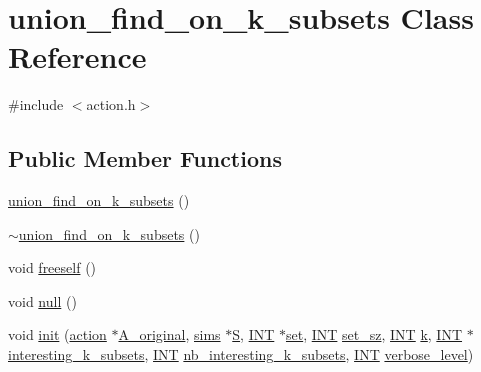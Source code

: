 \hypertarget{classunion__find__on__k__subsets}{}\section{union\+\_\+find\+\_\+on\+\_\+k\+\_\+subsets Class Reference}
\label{classunion__find__on__k__subsets}


{\ttfamily \#include $<$action.\+h$>$}

\subsection*{Public Member Functions}
\begin{DoxyCompactItemize}
\item 
\mbox{\hyperlink{classunion__find__on__k__subsets_a17b8d772080d27f13f0b80caefd0e727}{union\+\_\+find\+\_\+on\+\_\+k\+\_\+subsets}} ()
\item 
\mbox{\hyperlink{classunion__find__on__k__subsets_a51899d7dd8c5b989b398fba473188060}{$\sim$union\+\_\+find\+\_\+on\+\_\+k\+\_\+subsets}} ()
\item 
void \mbox{\hyperlink{classunion__find__on__k__subsets_a3e63adbe527692c3c73490de630fb371}{freeself}} ()
\item 
void \mbox{\hyperlink{classunion__find__on__k__subsets_a541bf34ce4b5db0e815a63ef6107f254}{null}} ()
\item 
void \mbox{\hyperlink{classunion__find__on__k__subsets_aad0de310a8e8df1ff78ee2eaf3ec1e54}{init}} (\mbox{\hyperlink{classaction}{action}} $\ast$\mbox{\hyperlink{classunion__find__on__k__subsets_a7426b6d7a6c231c5af1365dffd849587}{A\+\_\+original}}, \mbox{\hyperlink{classsims}{sims}} $\ast$\mbox{\hyperlink{classunion__find__on__k__subsets_a89f8222669c7ebe0245ddb2f191c4054}{S}}, \mbox{\hyperlink{galois_8h_a09fddde158a3a20bd2dcadb609de11dc}{I\+NT}} $\ast$\mbox{\hyperlink{nauty_8h_a9690bea211101f22a5e154087590c3da}{set}}, \mbox{\hyperlink{galois_8h_a09fddde158a3a20bd2dcadb609de11dc}{I\+NT}} \mbox{\hyperlink{classunion__find__on__k__subsets_a68eb55ea0295ba154b1e29b96a71b70e}{set\+\_\+sz}}, \mbox{\hyperlink{galois_8h_a09fddde158a3a20bd2dcadb609de11dc}{I\+NT}} \mbox{\hyperlink{classunion__find__on__k__subsets_a4e8261087b44b253fcb01a9d49441772}{k}}, \mbox{\hyperlink{galois_8h_a09fddde158a3a20bd2dcadb609de11dc}{I\+NT}} $\ast$\mbox{\hyperlink{classunion__find__on__k__subsets_a356f0bf9b754026870948f252b553cfd}{interesting\+\_\+k\+\_\+subsets}}, \mbox{\hyperlink{galois_8h_a09fddde158a3a20bd2dcadb609de11dc}{I\+NT}} \mbox{\hyperlink{classunion__find__on__k__subsets_a05d81605a3c42a96d888421d39bc0171}{nb\+\_\+interesting\+\_\+k\+\_\+subsets}}, \mbox{\hyperlink{galois_8h_a09fddde158a3a20bd2dcadb609de11dc}{I\+NT}} \mbox{\hyperlink{simeon_8_c_a818073fbcc2f439e7c56952f67386122}{verbose\+\_\+level}})

\end{DoxyCompactItemize}

